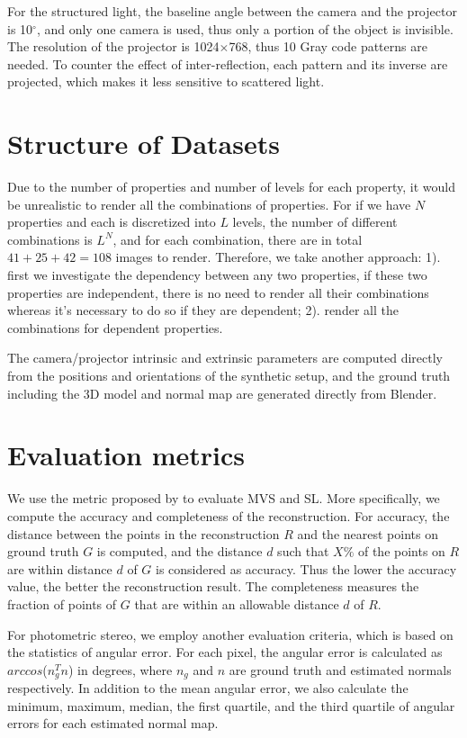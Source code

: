For the structured light, the baseline angle between the camera and the projector is 10$^\circ$, and only one camera is used, thus only a portion of the object is invisible. The resolution of the projector is 1024$\times$768, thus 10 Gray code patterns are needed. To counter the effect of inter-reflection, each pattern and its inverse are projected, which makes it less sensitive to scattered light.

\section{Structure of Datasets}
Due to the number of properties and number of levels for each property, it would be unrealistic to render all the combinations of properties. For if we have $N$ properties and each is discretized into $L$ levels, the number of different combinations is $L^N$, and for each combination, there are in total $41+25+42=108$ images to render. Therefore, we take another approach: 1). first we investigate the dependency between any two properties, if these two properties are independent, there is no need to render all their combinations whereas it's necessary to do so if they are dependent; 2). render all the combinations for dependent properties.

The camera/projector intrinsic and extrinsic parameters are computed directly from the positions and orientations of the synthetic setup, and the ground truth including the 3D model and normal map are generated directly from Blender.

\section{Evaluation metrics}
We use the metric proposed by \citeauthor{seitz2006comparison} to evaluate MVS and SL. More specifically, we compute the accuracy and completeness of the reconstruction. For accuracy, the distance between the points in the reconstruction $R$ and the nearest points on ground truth $G$ is computed, and the distance $d$ such that $X\%$ of the points on $R$ are within distance $d$ of $G$ is considered as accuracy. Thus the lower the accuracy value, the better the reconstruction result. The completeness measures the fraction of points of $G$ that are within an allowable distance $d$ of $R$.

For photometric stereo, we employ another evaluation criteria, which is based on the statistics of angular error. For each pixel, the angular error is calculated as $arccos$($n_g^T n$) in degrees, where $n_g$ and $n$ are ground truth and estimated normals respectively. In addition to the mean angular error, we also calculate the minimum, maximum, median, the first quartile, and the third quartile of angular errors for each estimated normal map.

